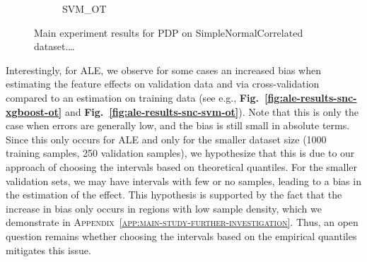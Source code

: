 \documentclass[runningheads]{llncs}
\begin{document}
\begin{figure}[htbp]
\begin{subfigure}[b]{0.49\textwidth}
        \caption{SVM\_OT}
        \label{fig:pdp-results-snc-svm-ot}  %
    \end{subfigure}
    \caption{Main experiment results for PDP on SimpleNormalCorrelated dataset.\dots}
    \label{fig:pdp-results-snc}  %
\end{figure}

Interestingly, for ALE, we observe for some cases an increased bias when estimating the feature effects on
validation data and via cross-validation compared to an estimation on training data (see e.g.,
\textbf{Fig.\@~\ref{fig:ale-results-snc-xgboost-ot}} and \textbf{Fig.\@~\ref{fig:ale-results-snc-svm-ot}}).
Note that this is only the case when errors are generally low, and the bias is still small in absolute terms.
Since this only occurs for ALE and only for the smaller dataset size (1000 training samples, 250 validation samples),
we hypothesize that this is due to our approach of choosing the intervals based on theoretical quantiles.
For the smaller validation sets, we may have intervals with few or no samples, leading to a bias in the
estimation of the effect. This hypothesis is supported by the fact that the increase in bias only occurs
in regions with low sample density, which we demonstrate in \textsc{Appendix~\ref{app:main-study-further-investigation}}.
Thus, an open question remains whether choosing the intervals based on the empirical quantiles mitigates this issue.
\end{document}

